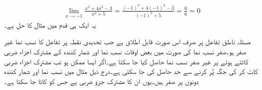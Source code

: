 \begin{align*}
\lim_{x\to -1}\frac{x^3+4x^2-3}{x^2+5}=\frac{(-1)^3+4(-1)^2-3}{(-1)^2+5}=\frac{0}{6}=0
\end{align*}
یہ ایک ہی قدم میں مثال  کا حل ہے۔

مسئلہ  ناطق تفاعل پر صرف اس صورت قابل اطلاق ہے جب تحدیدی نقطہ   پر تفاعل کا نسب نما غیر صفر ہو۔صفر نسب نما کی صورت میں بعض اوقات نسب نما اور شمار کنندہ کے مشترک اجزاء ضربی   کاٹتے ہوئے   پر غیر صفر نسب نما حاصل کیا جا سکتا ہے۔اگر ایسا ممکن ہو تب مشترک اجزاء ضربی کاٹ کر  کی جگہ  پُر کرنے سے حد حاصل کی جا سکتی ہے۔درج ذیل مثال میں نسب نما اور شمار کنندہ دونوں  پر صفر ہیں۔یوں  ان کا مشترک جزو ضربی ہے جس کو کاٹا جا سکتا ہے۔


